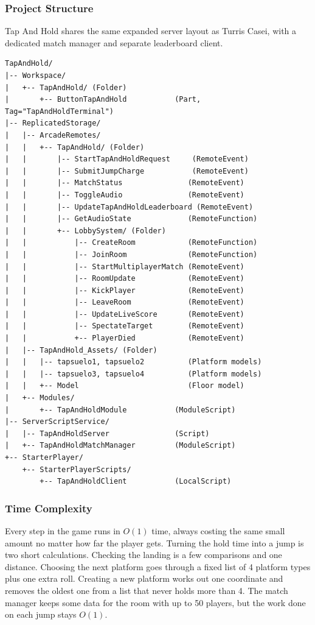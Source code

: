 \documentclass[12pt,letterpaper]{article}
\begin{document}
\subsubsection{Project Structure}

Tap And Hold shares the same expanded server layout as Turris Casei, with a dedicated match manager and separate leaderboard client.

\begin{lstlisting}
TapAndHold/
|-- Workspace/
|   +-- TapAndHold/ (Folder)
|       +-- ButtonTapAndHold           (Part, Tag="TapAndHoldTerminal")
|-- ReplicatedStorage/
|   |-- ArcadeRemotes/
|   |   +-- TapAndHold/ (Folder)
|   |       |-- StartTapAndHoldRequest     (RemoteEvent)
|   |       |-- SubmitJumpCharge           (RemoteEvent)
|   |       |-- MatchStatus               (RemoteEvent)
|   |       |-- ToggleAudio               (RemoteEvent)
|   |       |-- UpdateTapAndHoldLeaderboard (RemoteEvent)
|   |       |-- GetAudioState             (RemoteFunction)
|   |       +-- LobbySystem/ (Folder)
|   |           |-- CreateRoom            (RemoteFunction)
|   |           |-- JoinRoom              (RemoteFunction)
|   |           |-- StartMultiplayerMatch (RemoteEvent)
|   |           |-- RoomUpdate            (RemoteEvent)
|   |           |-- KickPlayer            (RemoteEvent)
|   |           |-- LeaveRoom             (RemoteEvent)
|   |           |-- UpdateLiveScore       (RemoteEvent)
|   |           |-- SpectateTarget        (RemoteEvent)
|   |           +-- PlayerDied            (RemoteEvent)
|   |-- TapAndHold_Assets/ (Folder)
|   |   |-- tapsuelo1, tapsuelo2          (Platform models)
|   |   |-- tapsuelo3, tapsuelo4          (Platform models)
|   |   +-- Model                         (Floor model)
|   +-- Modules/
|       +-- TapAndHoldModule           (ModuleScript)
|-- ServerScriptService/
|   |-- TapAndHoldServer               (Script)
|   +-- TapAndHoldMatchManager         (ModuleScript)
+-- StarterPlayer/
    +-- StarterPlayerScripts/
        +-- TapAndHoldClient           (LocalScript)
\end{lstlisting}

\subsubsection{Time Complexity}

Every step in the game runs in $O(1)$ time, always costing the same small amount no matter how far the player gets. Turning the hold time into a jump is two short calculations. Checking the landing is a few comparisons and one distance. Choosing the next platform goes through a fixed list of 4 platform types plus one extra roll. Creating a new platform works out one coordinate and removes the oldest one from a list that never holds more than 4. The match manager keeps some data for the room with up to 50 players, but the work done on each jump stays $O(1)$.
\end{document}
